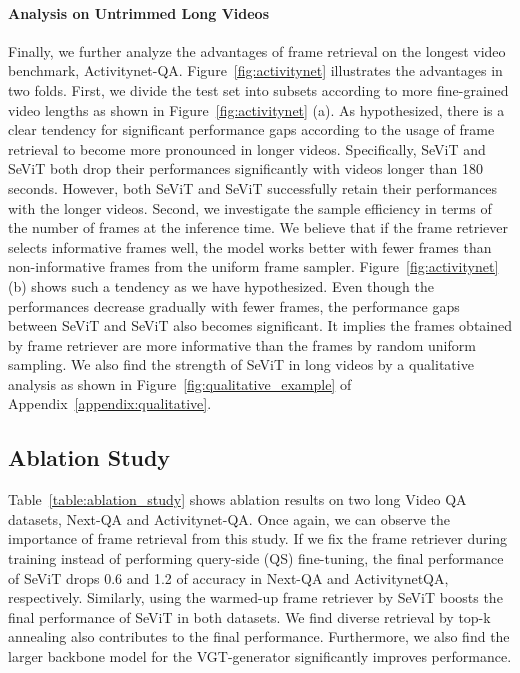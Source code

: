 \documentclass{article}
\newcommand{\frameworkname}{SeViT}
\begin{document}
\paragraph{Analysis on Untrimmed Long Videos}

Finally, we further analyze the advantages of frame retrieval on the longest video benchmark, Activitynet-QA. Figure~\ref{fig:activitynet} illustrates the advantages in two folds. First, we divide the test set into subsets according to more fine-grained video lengths as shown in Figure~\ref{fig:activitynet} (a). As hypothesized, there is a clear tendency for significant performance gaps according to the usage of frame retrieval to become more pronounced in longer videos. Specifically, \frameworkname{} and \frameworkname{} both drop their performances significantly with videos longer than 180 seconds. However, both \frameworkname{} and \frameworkname{} successfully retain their performances with the longer videos. Second, we investigate the sample efficiency in terms of the number of frames at the inference time. We believe that if the frame retriever selects informative frames well, the model works better with fewer frames than non-informative frames from the uniform frame sampler. Figure~\ref{fig:activitynet} (b) shows such a tendency as we have hypothesized. Even though the performances decrease gradually with fewer frames, the performance gaps between \frameworkname{} and \frameworkname{} also becomes significant. It implies the frames obtained by frame retriever are more informative than the frames by random uniform sampling. We also find the strength of \frameworkname{} in long videos by a qualitative analysis as shown in Figure~\ref{fig:qualitative_example} of Appendix~\ref{appendix:qualitative}.


\subsection{Ablation Study}


Table~\ref{table:ablation_study} shows ablation results on two long Video QA datasets, Next-QA and Activitynet-QA. Once again, we can observe the importance of frame retrieval from this study. If we fix the frame retriever during training instead of performing query-side (QS) fine-tuning, the final performance of \frameworkname{} drops 0.6 and 1.2 of accuracy in Next-QA and ActivitynetQA, respectively. Similarly, using the warmed-up frame retriever by \frameworkname{} boosts the final performance of \frameworkname{}  in both datasets. We find diverse retrieval by top-k annealing also contributes to the final performance. Furthermore, we also find the larger backbone model for the VGT-generator significantly improves performance.
\end{document}
